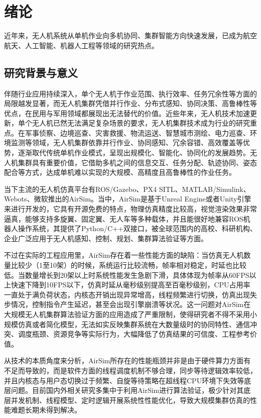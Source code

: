 \section{绪论}

近年来，无人机系统从单机作业向多机协同、集群智能方向快速发展，已成为航空航天、人工智能、机器人工程等领域的研究热点。

\subsection{研究背景与意义}

伴随行业应用持续深入，单个无人机于作业范围、执行效率、任务冗余性等方面的局限越发显著，而无人机集群凭借并行作业、分布式感知、协同决策、高鲁棒性等优点，在民用与军用领域都展现出无法替代的价值。近些年来，无人机技术加速更新，单个无人机已然无法满足复杂场景的要求，无人机集群技术成为行业的研究重点。在军事侦察、边境巡查、灾害救援、物流运送、智慧城市测绘、电力巡查、环境监测等领域，无人机集群依靠并行作业、协同感知、冗余容错、高效覆盖等优势，逐渐取代传统单机作业模式，呈现出规模化、智能化、协同化的发展趋势\cite{wu2003}。无人机集群具有重要价值，它借助多机之间的信息交互、任务分配、轨迹协同、姿态配合等方式，达成单机难以实现的大规模、高精度且高鲁棒性的作业任务。

当下主流的无人机仿真平台有ROS/Gazebo、PX4 SITL、MATLAB/Simulink、Webots、微软推出的AirSim。当中，AirSim是基于Unreal Engine或者Unity引擎来进行开发的，它具有开源免费的特点，物理仿真精度比较高，视觉渲染效果非常逼真，能够支持多旋翼、固定翼、无人车等多种载体，并且能很好地兼容ROS机器人操作系统\cite{airsim}，其提供了Python/C++双接口，被全球范围内的高校、科研机构、企业广泛应用于无人机感知、控制、规划、集群算法验证等方面。

不过在实际的工程应用里，AirSim存在着一些性能方面的缺陷：当仿真无人机数量比较少（1至10架）的时候，系统运行比较流畅，帧率相对稳定，时延也比较低。当数量增长到20架以上时系统性能发生急剧下滑，具体体现为帧率从60FPS以上快速下降到10FPS以下，仿真时延从毫秒级别提高至百毫秒级别，CPU占用率一直处于满负荷状态，内核态开销出现异常增高，线程频繁进行切换，仿真出现失步情况，控制指令产生延迟，甚至会出现引擎崩溃等状况。这一问题对AirSim在大规模无人机集群算法验证方面的应用造成了严重限制，使得研究者不得不采用小规模仿真或者简化模型，无法如实反映集群系统在大数量级时的协同特性、通信冲突、调度瓶颈、资源竞争等实际行为，大幅降低了仿真结果的可信度、工程参考价值\cite{chen2022,wu2023,dong2024}。

从技术的本质角度来分析，AirSim所存在的性能瓶颈并非是由于硬件算力方面有不足而导致的，而是软件方面的线程调度机制不够合理，同步等待逻辑效率较低，并且内核态与用户态切换过于频繁、自旋等待策略在超线程CPU环境下失效等底层问题。目前国内外相关研究多集中于利用AirSim进行算法验证\cite{fang2025}，极少针对其底层并发机制、线程模型、定时逻辑开展系统性性能优化\cite{lin2022,han2023,gao2022}，导致大规模集群仿真的性能难题长期未得到解决。

